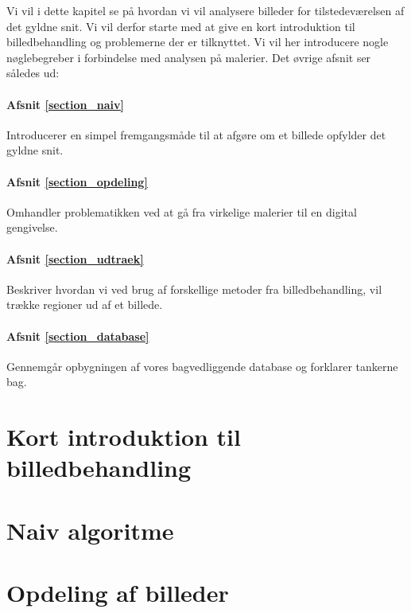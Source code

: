 {
{\sffamily Vi vil i dette kapitel se på hvordan vi vil analysere
billeder for tilstedeværelsen af det gyldne snit. Vi vil derfor starte
med at give en kort introduktion til billedbehandling og problemerne der
er tilknyttet. Vi vil her introducere nogle nøglebegreber i forbindelse
med analysen på malerier. Det øvrige afsnit ser således ud:

\paragraph{Afsnit \ref{section_naiv}} Introducerer en simpel
fremgangsmåde til at afgøre om et billede opfylder det gyldne snit.

\paragraph{Afsnit \ref{section_opdeling}} Omhandler problematikken
ved at gå fra virkelige malerier til en digital gengivelse.

\paragraph{Afsnit \ref{section_udtraek}} Beskriver hvordan vi ved brug
af forskellige metoder fra billedbehandling, vil trække regioner ud af
et billede.

\paragraph{Afsnit \ref{section_database}} Gennemgår opbygningen af vores
bagvedliggende database og forklarer tankerne bag.
}

\section{Kort introduktion til billedbehandling\label{section_kort_intro}}


\section{Naiv algoritme\label{section_naiv}}


\section{Opdeling af billeder\label{section_opdeling}}


}
